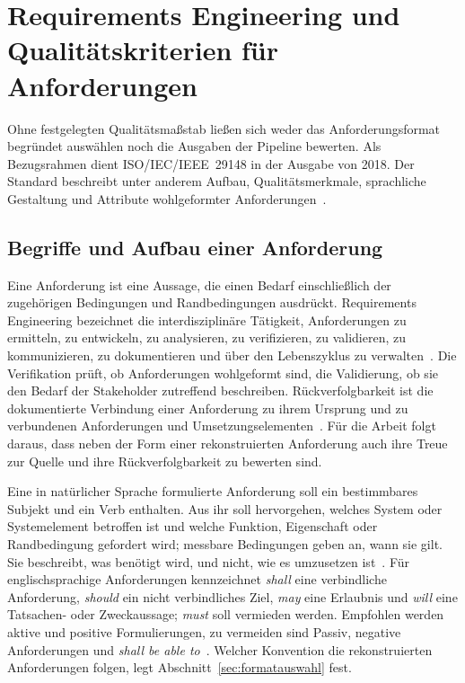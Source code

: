 \documentclass[11pt,a4paper]{report}
\begin{document}
\section{Requirements Engineering und Qualitätskriterien für Anforderungen}
\label{sec:anforderungsqualitaet}

Ohne festgelegten Qualitätsmaßstab ließen sich weder das
Anforderungsformat begründet auswählen noch die Ausgaben der Pipeline
bewerten. Als Bezugsrahmen dient ISO/IEC/IEEE~29148 in der Ausgabe von
2018. Der Standard beschreibt unter anderem Aufbau, Qualitätsmerkmale,
sprachliche Gestaltung und Attribute wohlgeformter
Anforderungen~\cite[Abschn.~1 und 5.2]{iso29148}.

\subsection{Begriffe und Aufbau einer Anforderung}
\label{subsec:re-begriffe}
\label{subsec:anforderungsaufbau}

Eine Anforderung ist eine Aussage, die einen Bedarf einschließlich der
zugehörigen Bedingungen und Randbedingungen ausdrückt. Requirements
Engineering bezeichnet die interdisziplinäre Tätigkeit, Anforderungen
zu ermitteln, zu entwickeln, zu analysieren, zu verifizieren, zu
validieren, zu kommunizieren, zu dokumentieren und über den
Lebenszyklus zu verwalten~\cite[Abschn.~3.1.19, 3.1.21 und
3.1.22]{iso29148}. Die Verifikation prüft, ob Anforderungen
wohlgeformt sind, die Validierung, ob sie den Bedarf der Stakeholder
zutreffend beschreiben. Rückverfolgbarkeit ist die dokumentierte
Verbindung einer Anforderung zu ihrem Ursprung und zu verbundenen
Anforderungen und Umsetzungselementen~\cite[Abschn.~3.1.23, 3.1.24
sowie 3.1.25--3.1.26]{iso29148}. Für die Arbeit folgt daraus, dass
neben der Form einer rekonstruierten Anforderung auch ihre Treue zur
Quelle und ihre Rückverfolgbarkeit zu bewerten sind.

Eine in natürlicher Sprache formulierte Anforderung soll ein
bestimmbares Subjekt und ein Verb enthalten. Aus ihr soll hervorgehen,
welches System oder Systemelement betroffen ist und welche Funktion,
Eigenschaft oder Randbedingung gefordert wird; messbare Bedingungen
geben an, wann sie gilt. Sie beschreibt, was benötigt wird, und nicht,
wie es umzusetzen ist~\cite[Abschn.~5.2.4 und 5.2.7]{iso29148}. Für
englischsprachige Anforderungen kennzeichnet \emph{shall} eine
verbindliche Anforderung, \emph{should} ein nicht verbindliches Ziel,
\emph{may} eine Erlaubnis und \emph{will} eine Tatsachen- oder
Zweckaussage; \emph{must} soll vermieden werden. Empfohlen werden
aktive und positive Formulierungen, zu vermeiden sind Passiv,
negative Anforderungen und \emph{shall be able
to}~\cite[Abschn.~5.2.4]{iso29148}. Welcher Konvention die
rekonstruierten Anforderungen folgen, legt
Abschnitt~\ref{sec:formatauswahl} fest.
\end{document}
